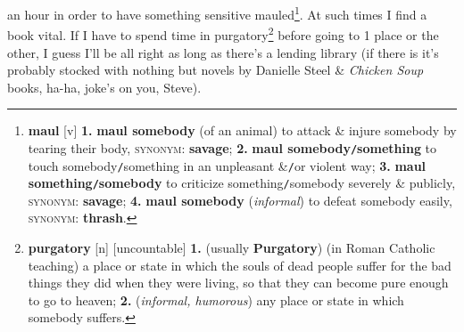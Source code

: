 \documentclass[oneside]{book}
\numberwithin{equation}{section}
\begin{document}
an hour in order to have something sensitive mauled\footnote{\textbf{maul} [v] \textbf{1.} \textbf{maul somebody} (of an animal) to attack \& injure somebody by tearing their body, \textsc{synonym}: \textbf{savage}; \textbf{2.} \textbf{maul somebody\texttt{/}something} to touch somebody\texttt{/}something in an unpleasant \&\texttt{/}or violent way; \textbf{3.} \textbf{maul something\texttt{/}somebody} to criticize something\texttt{/}somebody severely \& publicly, \textsc{synonym}: \textbf{savage}; \textbf{4.} \textbf{maul somebody} (\textit{informal}) to defeat somebody easily, \textsc{synonym}: \textbf{thrash}.}. At such times I find a book vital. If I have to spend time in purgatory\footnote{\textbf{purgatory} [n] [uncountable] \textbf{1.} (usually \textbf{Purgatory}) (in Roman Catholic teaching) a place or state in which the souls of dead people suffer for the bad things they did when they were living, so that they can become pure enough to go to heaven; \textbf{2.} (\textit{informal, humorous}) any place or state in which somebody suffers.} before going to 1 place or the other, I guess I'll be all right as long as there's a lending library (if there is it's probably stocked with nothing but novels by Danielle Steel \& \textit{Chicken Soup} books, ha-ha, joke's on you, Steve).
\end{document}
